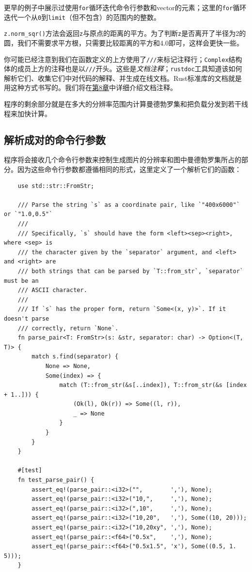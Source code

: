 更早的例子中展示过使用\texttt{for}循环迭代命令行参数和vector的元素；这里的\texttt{for}循环迭代一个从\texttt{0}到\texttt{limit}（但不包含）的范围内的整数。

\texttt{z.norm\_sqr()}方法会返回\texttt{z}与原点的距离的平方。为了判断\texttt{z}是否离开了半径为2的圆，我们不需要求平方根，只需要比较距离的平方和4.0即可，这样会更快一些。

你可能已经注意到我们在函数定义的上方使用了\texttt{///}来标记注释行；\texttt{Complex}结构体的成员上方的注释也是以\texttt{///}开头。这些是\emph{文档注释}；\texttt{rustdoc}工具知道该如何解析它们、收集它们中对代码的解释、并生成在线文档。Rust标准库的文档就是用这种方式书写的。我们将在\hyperref[ch08]{第8章}中详细介绍文档注释。

程序的剩余部分就是在多大的分辨率范围内计算曼德勃罗集和把负载分发到若干线程来加快计算。

\subsection{解析成对的命令行参数}
程序将会接收几个命令行参数来控制生成图片的分辨率和图中曼德勃罗集所占的部分。因为这些命令行参数都遵循相同的形式，这里定义了一个解析它们的函数：
\begin{verbatim}
    use std::str::FromStr;

    /// Parse the string `s` as a coordinate pair, like `"400x6000"` or `"1.0,0.5"`
    ///
    /// Specifically, `s` should have the form <left><sep><right>, where <sep> is
    /// the character given by the `separator` argument, and <left> and <right> are
    /// both strings that can be parsed by `T::from_str`, `separator` must be an
    /// ASCII character.
    ///
    /// If `s` has the proper form, return `Some<(x, y)>`. If it doesn't parse
    /// correctly, return `None`.
    fn parse_pair<T: FromStr>(s: &str, separator: char) -> Option<(T, T)> {
        match s.find(separator) {
            None => None,
            Some(index) => {
                match (T::from_str(&s[..index]), T::from_str(&s [index + 1..])) {
                    (Ok(l), Ok(r)) => Some((l, r)),
                    _ => None
                }
            }
        }
    }

    #[test]
    fn test_parse_pair() {
        assert_eq!(parse_pair::<i32>("",        ','), None);
        assert_eq!(parse_pair::<i32>("10,",     ','), None);
        assert_eq!(parse_pair::<i32>(",10",     ','), None);
        assert_eq!(parse_pair::<i32>("10,20",   ','), Some((10, 20)));
        assert_eq!(parse_pair::<i32>("10,20xy", ','), None);
        assert_eq!(parse_pair::<f64>("0.5x",    ','), None);
        assert_eq!(parse_pair::<f64>("0.5x1.5", 'x'), Some((0.5, 1. 5)));
    }
\end{verbatim}

